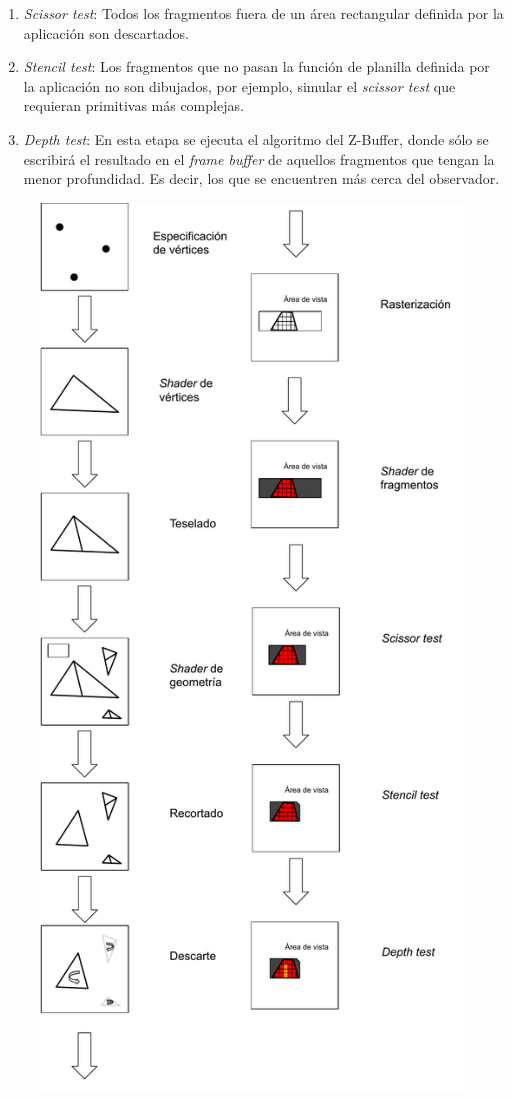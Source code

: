 \begin{enumerate}
\begin{enumerate}
			\item \textit{Scissor test}: Todos los fragmentos fuera de un área rectangular definida por la aplicación son descartados.
			\item \textit{Stencil test}: Los fragmentos que no pasan la función de planilla definida por la aplicación no son dibujados, por ejemplo, simular el \textit{scissor test} que requieran primitivas más complejas.
			\item \textit{Depth test}: En esta etapa se ejecuta el algoritmo del Z-Buffer, donde sólo se escribirá el resultado en el \textit{frame buffer} de aquellos fragmentos que tengan la menor profundidad. Es decir, los que se encuentren más cerca del observador.
		\end{enumerate}
\end{enumerate}

\clearpage

\vspace{5mm}
\begin{figure}[H]
	\centering
	\includegraphics[width=0.55\linewidth]{assets/OpenGL}
	\label{img:pipelinegl}
\end{figure}


